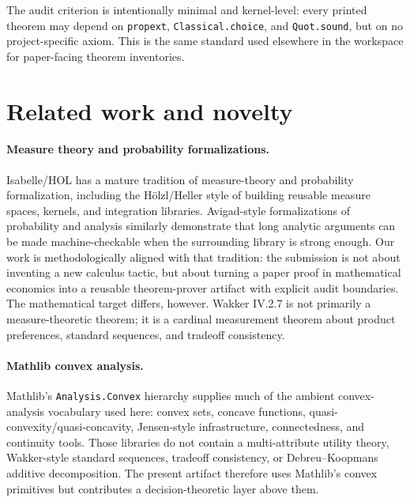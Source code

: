 \documentclass[11pt,english]{article}
\begin{document}
The audit criterion is intentionally minimal and kernel-level: every printed theorem may depend on \texttt{propext}, \texttt{Classical.choice}, and \texttt{Quot.sound}, but on no project-specific axiom.  This is the same standard used elsewhere in the workspace for paper-facing theorem inventories.

\section{Related work and novelty}
\label{sec:related}

\paragraph{Measure theory and probability formalizations.}
Isabelle/HOL has a mature tradition of measure-theory and probability formalization, including the Hölzl/Heller style of building reusable measure spaces, kernels, and integration libraries.  Avigad-style formalizations of probability and analysis similarly demonstrate that long analytic arguments can be made machine-checkable when the surrounding library is strong enough.  Our work is methodologically aligned with that tradition: the submission is not about inventing a new calculus tactic, but about turning a paper proof in mathematical economics into a reusable theorem-prover artifact with explicit audit boundaries.  The mathematical target differs, however.  Wakker IV.2.7 is not primarily a measure-theoretic theorem; it is a cardinal measurement theorem about product preferences, standard sequences, and tradeoff consistency.

\paragraph{Mathlib convex analysis.}
Mathlib's \texttt{Analysis.Convex} hierarchy supplies much of the ambient convex-analysis vocabulary used here: convex sets, concave functions, quasi-convexity/quasi-concavity, Jensen-style infrastructure, connectedness, and continuity tools.  Those libraries do not contain a multi-attribute utility theory, Wakker-style standard sequences, tradeoff consistency, or Debreu--Koopmans additive decomposition.  The present artifact therefore uses Mathlib's convex primitives but contributes a decision-theoretic layer above them.
\end{document}
